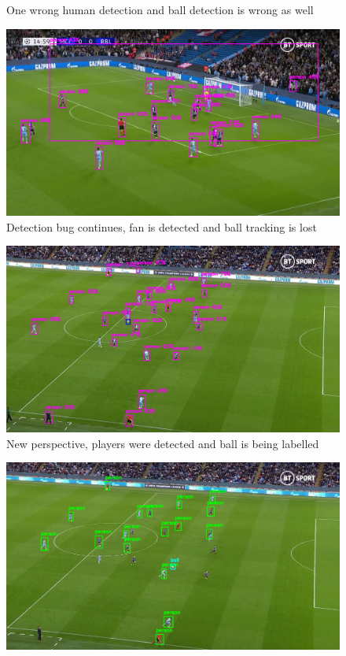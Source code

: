 \documentclass[
    11pt,
    oneside
]{report}
\begin{document}
\begin{appendices}
\begin{figure}[H]
    \caption{One wrong human detection and ball detection is wrong as well}
    \label{img:11}
\end{figure}
\begin{figure}[H]
    \includegraphics[keepaspectratio, width=\columnwidth]{Screenshot_2022-03-03_23-08-00.png}
    \caption{Detection bug continues, fan is detected and ball tracking is lost}
    \label{img:12}
\end{figure}
\begin{figure}[H]
    \includegraphics[keepaspectratio, width=\columnwidth]{Screenshot_2022-03-03_23-09-45.png}
    \caption{New perspective, players were detected and ball is being labelled}
    \label{img:13}
\end{figure}
\begin{figure}[H]
    \includegraphics[keepaspectratio, width=\columnwidth]{Screenshot_2022-03-03_23-10-58.png}

\end{figure}
\end{appendices}
\end{document}
